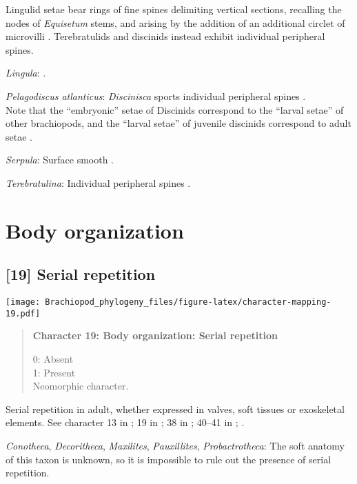 \documentclass[openany]{book}
\theoremstyle{definition}
\theoremstyle{definition}
\theoremstyle{definition}
\theoremstyle{remark}
\begin{document}
Lingulid setae bear rings of fine spines delimiting vertical sections,
recalling the nodes of \emph{Equisetum} stems, and arising by the
addition of an additional circlet of microvilli \citep[see][fig.
1e]{Luter2000}. Terebratulids and discinids instead exhibit individual
peripheral spines.

\hypertarget{Lingula-coding-18}{}
\emph{Lingula}: \citet{Luter2000}.

\hypertarget{Pelagodiscus_atlanticus-coding-18}{}
\emph{Pelagodiscus atlanticus}: \emph{Discinisca} sports individual
peripheral spines \citep{Williams1997Introduction, Luter2003}.\\
Note that the ``embryonic'' setae of Discinids correspond to the
``larval setae'' of other brachiopods, and the ``larval setae'' of
juvenile discinids correspond to adult setae \citep{Luter2003}.

\hypertarget{Serpula-coding-18}{}
\emph{Serpula}: Surface smooth \citep{Sun2012}.

\hypertarget{Terebratulina-coding-18}{}
\emph{Terebratulina}: Individual peripheral spines \citep[in
\emph{Calloria};][]{Luter2000}.

\section{Body organization}\label{body-organization}

\subsection*{{[}19{]} Serial repetition}\label{serial-repetition}

\texttt{[image: Brachiopod\_phylogeny\_files/figure-latex/character-mapping-19.pdf]}

\begin{quote}
\textbf{Character 19: Body organization: Serial repetition}

0: Absent\\
1: Present\\
Neomorphic character.
\end{quote}

Serial repetition in adult, whether expressed in valves, soft tissues or
exoskeletal elements. See character 13 in \citet{Rouse1999}; 19 in
\citet{Vinther2008}; 38 in \citet{Haszprunar1996}; 40--41 in
\citet{Sutton2012}; \citet{Wanninger2009}.

\hypertarget{Conotheca-coding-19}{}
\emph{Conotheca}, \emph{Decoritheca}, \emph{Maxilites},
\emph{Pauxillites}, \emph{Probactrotheca}: The soft anatomy of this
taxon is unknown, so it is impossible to rule out the presence of serial
repetition.
\end{document}
